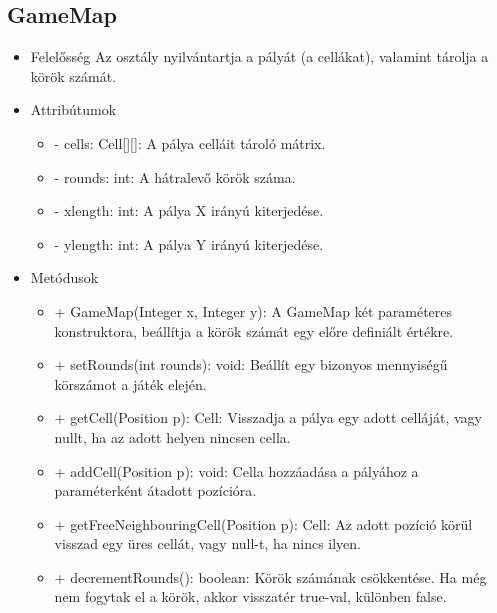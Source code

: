 \subsection{GameMap}
\begin{itemize}
\item Felelősség\newline
Az osztály nyilvántartja a pályát (a cellákat), valamint tárolja a körök számát.

\item Attribútumok
	\begin{itemize}
		\item - cells: Cell[][]: A pálya celláit tároló mátrix.
		\item - rounds: int: A hátralevő körök száma.
		\item - xlength: int: A pálya X irányú kiterjedése.
		\item - ylength: int: A pálya Y irányú kiterjedése.
	\end{itemize}
\item Metódusok
	\begin{itemize}
		\item + GameMap(Integer x, Integer y):  A GameMap két paraméteres konstruktora, beállítja a körök számát egy előre definiált értékre.
		\item + setRounds(int rounds): void: Beállít egy bizonyos mennyiségű körszámot a játék elején.
		\item + getCell(Position p): Cell: Visszadja a pálya egy adott celláját, vagy nullt, ha az adott helyen nincsen cella.
		\item + addCell(Position p): void: Cella hozzáadása a pályához a paraméterként átadott pozícióra.
		\item + getFreeNeighbouringCell(Position p): Cell: Az adott pozíció körül visszad egy üres cellát, vagy null-t, ha nincs ilyen.
		\item + decrementRounds(): boolean: Körök számának csökkentése. Ha még nem fogytak el a körök, akkor visszatér true-val, különben false. 
	\end{itemize}
\end{itemize}

